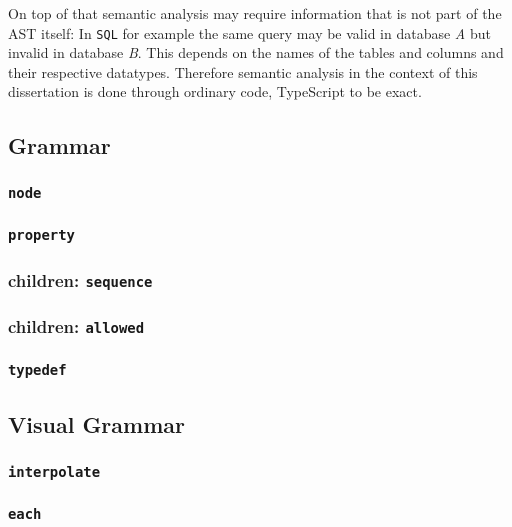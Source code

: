 On top of that semantic analysis may require information that is not part of the AST itself: In \texttt{SQL} for example the same query may be valid in database \textit{A} but invalid in database \textit{B}. This depends on the names of the tables and columns and their respective datatypes. Therefore semantic analysis in the context of this dissertation is done through ordinary code, TypeScript to be exact.



\subsection{Grammar}

\subsubsection{\texttt{node}}

\subsubsection{\texttt{property}}

\subsubsection{children: \texttt{sequence}}

\subsubsection{children: \texttt{allowed}}

\subsubsection{\texttt{typedef}}

\subsection{Visual Grammar}

\subsubsection{\texttt{interpolate}}

\subsubsection{\texttt{each}}

